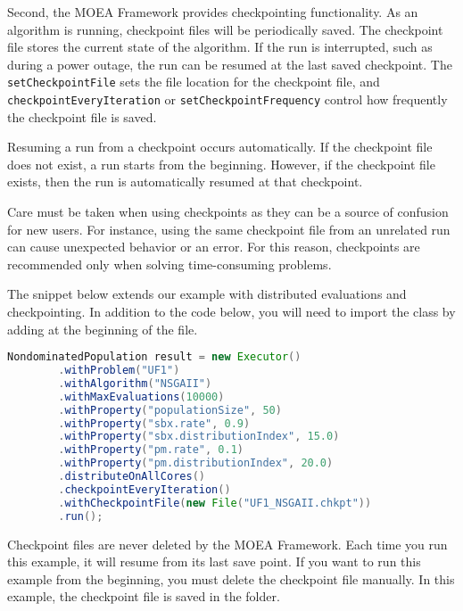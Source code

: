Second, the MOEA Framework provides checkpointing functionality.  As an algorithm is running, checkpoint files will be periodically saved.  The checkpoint file stores the current state of the algorithm.  If the run is interrupted, such as during a power outage, the run can be resumed at the last saved checkpoint.  The \texttt{setCheckpointFile} sets the file location for the checkpoint file, and \texttt{checkpointEveryIteration} or \texttt{setCheckpointFrequency} control how frequently the checkpoint file is saved.

Resuming a run from a checkpoint occurs automatically.  If the checkpoint file does not exist, a run starts from the beginning.  However, if the checkpoint file exists, then the run is automatically resumed at that checkpoint.

\begin{tip}
Care must be taken when using checkpoints as they can be a source of confusion for new users.  For instance, using the same checkpoint file from an unrelated run can cause unexpected behavior or an error.  For this reason, checkpoints are recommended only when solving time-consuming problems.
\end{tip}

The snippet below extends our example with distributed evaluations and checkpointing.  In addition to the code below, you will need to import the  class by adding  at the beginning of the file.

\begin{lstlisting}[language=Java]
NondominatedPopulation result = new Executor()
		.withProblem("UF1")
		.withAlgorithm("NSGAII")
		.withMaxEvaluations(10000)
		.withProperty("populationSize", 50)
		.withProperty("sbx.rate", 0.9)
		.withProperty("sbx.distributionIndex", 15.0)
		.withProperty("pm.rate", 0.1)
		.withProperty("pm.distributionIndex", 20.0)
		.distributeOnAllCores()
		.checkpointEveryIteration()
		.withCheckpointFile(new File("UF1_NSGAII.chkpt"))
		.run();
\end{lstlisting}

\begin{important}
Checkpoint files are never deleted by the MOEA Framework.  Each time you run this example, it will resume from its last save point.  If you want to run this example from the beginning, you must delete the checkpoint file manually.  In this example, the checkpoint file is saved in the \folder{\moeaframework} folder.
\end{important}

